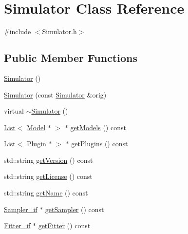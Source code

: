 \hypertarget{class_simulator}{\section{Simulator Class Reference}
\label{class_simulator}
}


{\ttfamily \#include $<$Simulator.\-h$>$}

\subsection*{Public Member Functions}
\begin{DoxyCompactItemize}
\item 
\hyperlink{class_simulator_a031573bfcfe2e0f5c9539bcc1c7fc5d9}{Simulator} ()
\item 
\hyperlink{class_simulator_ad0a136ed876c971effe90fa749f18148}{Simulator} (const \hyperlink{class_simulator}{Simulator} \&orig)
\item 
virtual \hyperlink{class_simulator_a0f49aa04f42060a785adf77346b9de9f}{$\sim$\-Simulator} ()
\item 
\hyperlink{class_list}{List}$<$ \hyperlink{class_model}{Model} $\ast$ $>$ $\ast$ \hyperlink{class_simulator_adf2949b99c40c3c94c790786de1a038f}{get\-Models} () const 
\item 
\hyperlink{class_list}{List}$<$ \hyperlink{class_plugin}{Plugin} $\ast$ $>$ $\ast$ \hyperlink{class_simulator_a0e68b96d9af4bb7cf3f0b8a5c2e66d31}{get\-Plugins} () const 
\item 
std\-::string \hyperlink{class_simulator_a2e9d26646db9e0cc35a870514d8dcc3e}{get\-Version} () const 
\item 
std\-::string \hyperlink{class_simulator_ae180aeffe94a7b0af5fb64ce8ad29810}{get\-License} () const 
\item 
std\-::string \hyperlink{class_simulator_a767a6811df08f6327524ab6ccb715672}{get\-Name} () const 
\item 
\hyperlink{class_sampler__if}{Sampler\-\_\-if} $\ast$ \hyperlink{class_simulator_a7477e74d6751ea9e4b841178b0c42f34}{get\-Sampler} () const 
\item 
\hyperlink{class_fitter__if}{Fitter\-\_\-if} $\ast$ \hyperlink{class_simulator_a7498ab51b3112e487f73eefb6d384b74}{get\-Fitter} () const 
\end{DoxyCompactItemize}


